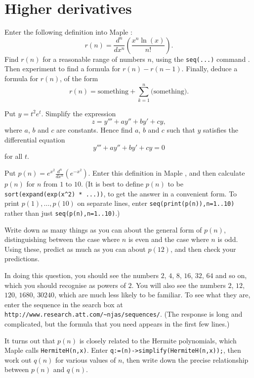 \documentclass[a4paper,10pt]{amsbook}
\numberwithin{example}{chapter}
\begin{document}
\section{Higher derivatives}

\begin{exercise}\label{ex-Psi}
 Enter the following definition into Maple
 \note{\NOTEseriesdef,\NOTEmultidiff}:
 \[ r(n) =
    \frac{d^n}{dx^n}\left(\frac{x^n\ln(x)}{n!}\right). 
 \]
 Find $r(n)$ for a reasonable range of numbers $n$, using
 the \verb~seq(...)~ command \note{\NOTEseq}.  Then
 experiment to find a formula for $r(n)-r(n-1)$.  Finally,
 deduce a formula for $r(n)$, of the form
 \[ r(n) = \text{something} +
            \sum_{k=1}^{n}\text{(something)}. 
 \]
\end{exercise}

\begin{exercise}\label{ex-diffop-jordan}
 Put $y=t^2e^t$.  Simplify the expression 
 \[ z = y''' + a y'' + b y' + c y, \]
 where $a$, $b$ and $c$ are constants.  Hence find $a$, $b$
 and $c$ such that $y$ satisfies the differential equation 
 \[ y''' + a y'' + by' + c y = 0 \]
 for all $t$. 
\end{exercise}

\begin{exercise}\label{ex-hermite}
 Put $p(n)=e^{x^2}\frac{d^n}{dx^n}(e^{-x^2})$.  Enter this
 definition in Maple \note{\NOTEseriesdef,\NOTEmultidiff}, and then
 calculate $p(n)$ for $n$ from  $1$ to $10$.  (It is best to
 define $p(n)$ to be \verb~sort(expand(exp(x^2) * ...))~, to
 get the  answer in a convenient form.  To print
 $p(1),\ldots,p(10)$ on separate lines, enter
 \verb~seq(print(p(n)),n=1..10)~ rather than just
 \verb~seq(p(n),n=1..10)~.)  
 
 Write down as many things as you can about the general form
 of $p(n)$, distinguishing between the case where $n$ is
 even and the case where $n$ is odd.  Using these, predict
 as much as you can about $p(12)$, and then
 check your predictions. 
 
 In doing this question, you should see the numbers $2$,
 $4$, $8$, $16$, $32$, $64$ and so on, which you should
 recognise as powers of $2$.  You will also see the numbers
 $2$, $12$, $120$, $1680$, $30240$, which are much less
 likely to be familiar.  To see what they are, enter the
 sequence in the search box at
 \verb+http://www.research.att.com/~njas/sequences/+.  (The
 response is long and complicated, but the formula that you
 need appears in the first few lines.) 

 It turns out that $p(n)$ is closely related to the Hermite
 polynomials, which Maple calls \verb~HermiteH(n,x)~.  Enter 
 \verb~q:=(n)->simplify(HermiteH(n,x));~, then work out
 $q(n)$ for various values of $n$, then write down the
 precise relationship between $p(n)$ and $q(n)$.  
\end{exercise}
\end{document}
